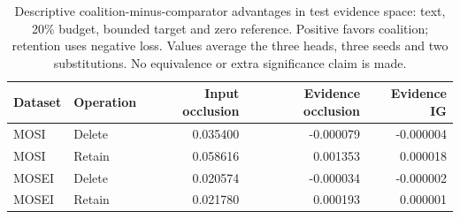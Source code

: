 \begin{table}[!htbp]\centering\small
\caption{Descriptive coalition-minus-comparator advantages in test evidence space: text, 20\% budget, bounded target and zero reference. Positive favors coalition; retention uses negative loss. Values average the three heads, three seeds and two substitutions. No equivalence or extra significance claim is made.}\label{tab:test-comparators}
\begin{tabular}{llrrr}\toprule Dataset & Operation & Input occlusion & Evidence occlusion & Evidence IG \\\midrule
MOSI & Delete & 0.035400 & -0.000079 & -0.000004 \\
MOSI & Retain & 0.058616 & 0.001353 & 0.000018 \\
MOSEI & Delete & 0.020574 & -0.000034 & -0.000002 \\
MOSEI & Retain & 0.021780 & 0.000193 & 0.000001 \\
\bottomrule\end{tabular}\end{table}
